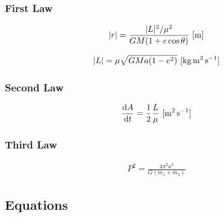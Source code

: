 \documentclass[a4paper,10pt]{article}
\begin{document}
\subsubsection{First Law}

\begin{align*}
    |r| = \frac{|L|^2/\mu^2}{GM(1+e\cos\theta)}~[{\rm m}]
\end{align*}

\begin{align*}
    |L| = \mu\sqrt{GMa(1-e^2)}~[{\rm kg\,m^2\,s^{-1}}]
\end{align*}

\subsubsection{Second Law}

\begin{align*}
    \frac{{\rm d}A}{{\rm d}t} = \frac{1}{2}\frac{L}{\mu}~[\rm m^2\,s^{-1}]
\end{align*}

\subsubsection{Third Law}

\begin{align*}
    P^2 = \frac{4\pi^2a^3}{G(m_1+m_2)}
\end{align*}

\subsection{Equations}
\end{document}
